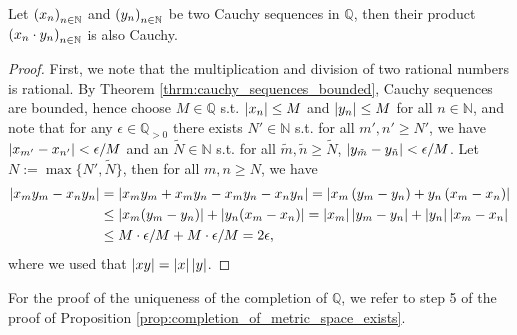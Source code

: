 \begin{theorem}\label{thrm:prod_Cauchy_sequences_Cauchy}
	Let $\seq[x_n]$ and $\seq[y_n]$ be two Cauchy sequences in $\mathbb Q$, then their product $\seq[x_n \cdot y_n]$ is also Cauchy.
\end{theorem}

\begin{proof}
	First, we note that the multiplication and division of two rational numbers is rational. By Theorem \ref{thrm:cauchy_sequences_bounded}, Cauchy sequences are bounded, hence choose $M\in\mathbb Q$ s.t. $\abs{x_n}\leq M$ and $\abs{y_n}\leq M$ for all $n\in\mathbb N$, and note that for any $\epsilon\in\mathbb Q_{>0}$ there exists $N'\in\mathbb N$ s.t. for all $m', n'\geq N'$, we have $\abs{x_{m'} - x_{n'}} < \epsilon/M$ and an $\tilde{N}\in\mathbb N$ s.t. for all $\tilde{m}, \tilde{n}\geq \tilde{N}$, $\abs{y_{\tilde{m}} - y_{\tilde{n}}} < \epsilon/M$. Let $N := \max\{N', \tilde{N}\}$, then for all $m, n\geq N$, we have
	\begin{align*}
		\abs{x_my_m - x_ny_n} &= \abs{x_my_m + x_my_n - x_my_n - x_ny_n} = \abs{x_m\left(y_m - y_n\right) + y_n\left(x_m - x_n\right)}
		\\ &\leq \abs{x_m(y_m - y_n)} + \abs{y_n(x_m - x_n)} = \abs{x_m}\abs{y_m - y_n} + \abs{y_n}\abs{x_m - x_n}
		\\ &\leq M\cdot \epsilon/M + M\cdot \epsilon/M = 2\epsilon,
	\end{align*}
	where we used that $\abs{xy} = \abs{x}\abs{y}$. 
\end{proof}

\begin{remark}
	For the proof of the uniqueness of the completion of $\mathbb Q$, we refer to step 5 of the proof of Proposition \ref{prop:completion_of_metric_space_exists}.
\end{remark}